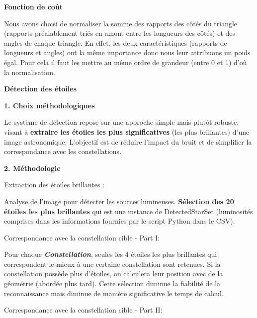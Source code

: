 \vspace{0.4cm}

\noindent \textbf{Fonction de coût}

Nous avons choisi de normaliser la somme des rapports des côtés du triangle (rapports préalablement triés en amont entre les longueurs des côtés) et des angles de chaque triangle. En effet, les deux caractéristiques (rapports de longueurs et angles) ont la même importance donc nous leur attribuons un poids égal. Pour cela il faut les mettre au même ordre de grandeur (entre 0 et 1) d'où la normalisation.

\vspace{0.4cm}

\noindent \textbf{Détection des étoiles}

\vspace{0.2cm}

\noindent \textbf{1. Choix méthodologiques}

Le système de détection repose sur une approche simple mais plutôt robuste, visant à \textbf{extraire les étoiles les plus significatives} (les plus brillantes) d’une image astronomique. L’objectif est de réduire l’impact du bruit et de simplifier la correspondance avec les constellations.

\vspace{0.2cm}

\noindent \textbf{2. Méthodologie}

\noindent Extraction des étoiles brillantes :

Analyse de l’image pour détecter les sources lumineuses.
\textbf{Sélection des 20 étoiles les plus brillantes} qui est une instance de DetectedStarSet (luminosités comprises dans les informations fournies par le script Python dans le CSV).

\vspace{0.1cm}

\noindent Correspondance avec la constellation cible - Part I:

Pour chaque \textbf{\textit{Constellation}}, seules les 4 étoiles les plus brillantes qui correspondent le mieux à une certaine constellation sont retenues. Si la constellation possède plus d'étoiles, on calculera leur position avec de la géométrie (abordée plus tard).
Cette sélection diminue la fiabilité de la reconnaissance mais diminue de manière significative le temps de calcul.

\vspace{0.1cm}

\noindent Correspondance avec la constellation cible - Part II:

